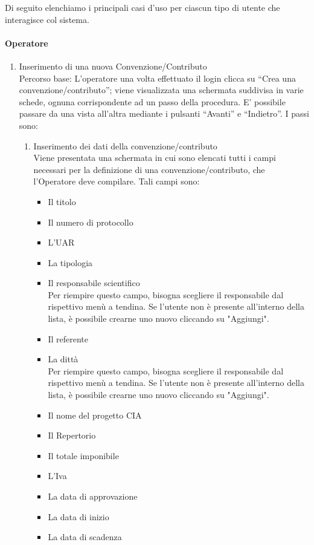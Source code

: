 Di seguito elenchiamo i principali casi d'uso per ciascun tipo di utente che interagisce col sistema.
\paragraph{Operatore}
\begin{enumerate}
  \item Inserimento di una nuova Convenzione/Contributo\\
  
  Percorso base:
  L'operatore una volta effettuato il login clicca su ``Crea una convenzione/contributo''; viene visualizzata una schermata suddivisa in varie schede,
  ognuna corrispondente ad un passo della procedura. E' possibile passare da una vista all'altra mediante i pulsanti ``Avanti'' e ``Indietro''. I passi sono:
  \begin{enumerate}
    \item Inserimento dei dati della convenzione/contributo\\
      
      Viene presentata una schermata in cui sono elencati tutti i campi necessari per la definizione di una convenzione/contributo, 
      che l'Operatore deve compilare. Tali campi sono:
      \begin{itemize}
	\item Il titolo
	\item Il numero di protocollo
	\item L'UAR
	\item La tipologia
	\item Il responsabile scientifico\\
	  Per riempire questo campo, bisogna scegliere il responsabile dal rispettivo menù a tendina. 
	  Se l'utente non è presente all'interno della lista, è possibile crearne uno nuovo cliccando su "Aggiungi".
	\item Il referente
	\item La dittà\\
	   Per riempire questo campo, bisogna scegliere il responsabile dal rispettivo menù a tendina. 
	  Se l'utente non è presente all'interno della lista, è possibile crearne uno nuovo cliccando su "Aggiungi".
	\item Il nome del progetto CIA
	\item Il Repertorio
	\item Il totale imponibile
	\item L'Iva
	\item La data di approvazione
	\item La data di inizio
	\item La data di scadenza
      \end{itemize}
      

\end{enumerate}
\end{enumerate}
